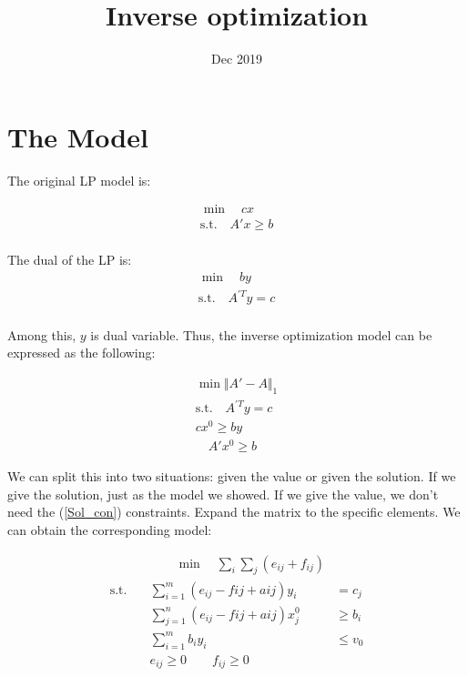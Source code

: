 \documentclass[UTF8]{article}
\title{Inverse optimization}
\date{Dec 2019}
\begin{document}
\maketitle{}

\section{The Model}

The original LP model is:

\begin{align*}
  \min \quad cx \\
\text{s.t.} \quad A'x \geq b  \\
\end{align*}

The dual of the LP is:
\begin{align*}
  \min \quad by \\
\text{s.t.} \quad A^{'T}y = c  \\
\end{align*}

Among this, $y$ is dual variable.
Thus, the inverse optimization model can be expressed as the following:

\begin{align}
  \min \Vert A'-A \Vert_1 \nonumber \\
\mathrm{s.t.}  \quad A^{'T}y = c  \\
  cx^0 \geq by  \\
  \quad A'x^0 \geq b \label{Sol_con}
\end{align}

We can split this into two situations: given the value or given the solution. If we give the solution, just as the model we showed. If we give the value, we don't need the (\ref{Sol_con}) constraints.
Expand the matrix to the specific elements. We can obtain the corresponding model:

\begin{equation}
\begin{align*}
&\qquad \min \quad \sum_i \sum_j (e_{ij}+f_{ij})\\
\mathrm{s.t.} \quad &\sum_{i=1}^m (e_{ij}-f{ij}+a{ij})y_i & = c_j \\
&\sum_{j=1}^n (e_{ij}-f{ij}+a{ij})x_j^0 & \geq b_i \\
&\sum_{i=1}^m b_i y_i & \leq v_0 \\
&e_{ij} \geq 0 \qquad f_{ij} \geq 0
\end{align*}
\end{equation}
\end{document}
